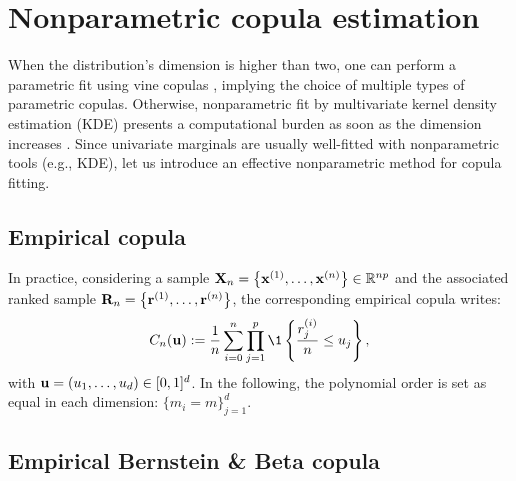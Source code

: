 \chapter{Nonparametric copula estimation}
\label{apx:B}



When the distribution's dimension is higher than two, one can perform a parametric fit using vine copulas \citep{joe2011dependence}, implying the choice of multiple types of parametric copulas. 
Otherwise, nonparametric fit by multivariate kernel density estimation (KDE) presents a computational burden as soon as the dimension increases \citep{chabridon2021global}. 
Since univariate marginals are usually well-fitted with nonparametric tools (e.g., KDE), let us introduce an effective nonparametric method for copula fitting.

\section{Empirical copula}
In practice, considering a sample ${\bf X}_n = \left\{{\bf x}^{(1)}, \dots, {\bf x}^{(n)}\right\} \in \mathbb{R}^{np}$ and the associated ranked sample ${\bf R}_n = \left\{{\bf r}^{(1)}, \dots, {\bf r}^{(n)}\right\}$, the corresponding empirical copula writes: 
\begin{equation}
    C_n(\bu) := \frac1n \sum_{i=0}^{n} \prod_{j=1}^{p} \1 \left\{ \frac{r_j^{(i)}}{n} \leq u_j \right\},
\end{equation}
with ${\bf u} = (u_1, \dots, u_d) \in [0, 1]^d$. In the following, the polynomial order is set as equal in each dimension: $\{m_i = m\}_{j=1}^d$. 

\section{Empirical Bernstein \& Beta copula}

